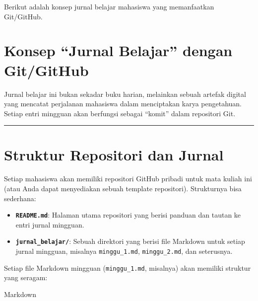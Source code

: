 \documentclass[
  letterpaper,
  DIV=11,
  numbers=noendperiod]{scrreprt}
\begin{document}
Berikut adalah konsep jurnal belajar mahasiswa yang memanfaatkan
Git/GitHub.

\section{Konsep ``Jurnal Belajar'' dengan
Git/GitHub}\label{konsep-jurnal-belajar-dengan-gitgithub}

Jurnal belajar ini bukan sekadar buku harian, melainkan sebuah artefak
digital yang mencatat perjalanan mahasiswa dalam menciptakan karya
pengetahuan. Setiap entri mingguan akan berfungsi sebagai ``komit''
dalam repositori Git.

\begin{center}\rule{0.5\linewidth}{0.5pt}\end{center}

\section{Struktur Repositori dan
Jurnal}\label{struktur-repositori-dan-jurnal}

Setiap mahasiswa akan memiliki repositori GitHub pribadi untuk mata
kuliah ini (atau Anda dapat menyediakan sebuah template repositori).
Strukturnya bisa sederhana:

\begin{itemize}
\item
  \textbf{\texttt{README.md}}: Halaman utama repositori yang berisi
  panduan dan tautan ke entri jurnal mingguan.
\item
  \textbf{\texttt{jurnal\_belajar/}}: Sebuah direktori yang berisi file
  Markdown untuk setiap jurnal mingguan, misalnya \texttt{minggu\_1.md},
  \texttt{minggu\_2.md}, dan seterusnya.
\end{itemize}

Setiap file Markdown mingguan (\texttt{minggu\_1.md}, misalnya) akan
memiliki struktur yang seragam:

Markdown
\end{document}
